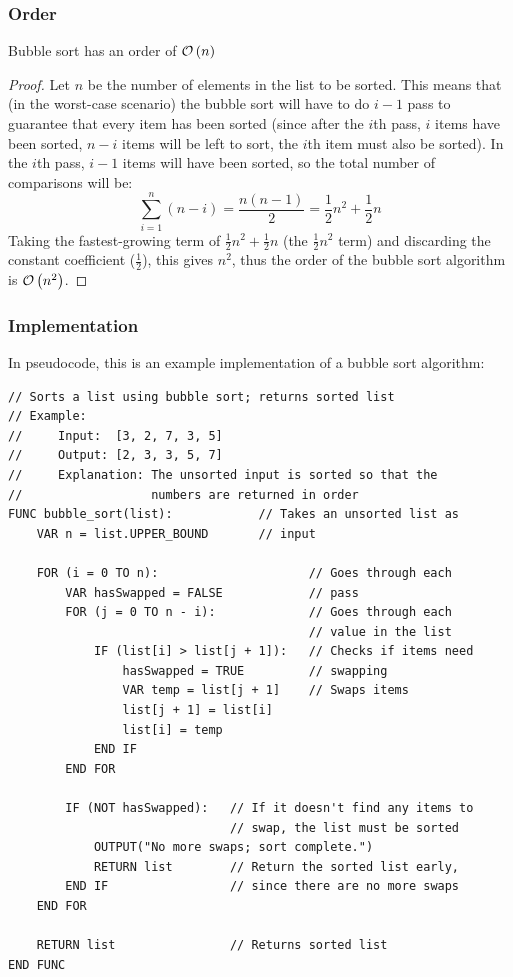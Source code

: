         \subsubsection{Order}
            \begin{theorem}
                Bubble sort has an order of $\mathcal{O}\left(n\right)$
            \end{theorem}
            \begin{proof}
                Let $n$ be the number of elements in the list to be sorted.
                This means that (in the worst-case scenario) the bubble sort will have to do $i-1$ pass to guarantee that every item has been sorted (since after the $i$th pass, $i$ items have been sorted, $n-i$ items will be left to sort, the $i$th item must also be sorted).
                In the $i$th pass, $i-1$ items will have been sorted, so the total number of comparisons will be:
                $$\sum_{i=1}^n(n-i)=\frac{n(n-1)}{2}=\frac{1}{2}n^2+\frac{1}{2}n$$
                Taking the fastest-growing term of $\frac{1}{2}n^2+\frac{1}{2}n$ (the $\frac{1}{2}n^2$ term) and discarding the constant coefficient ($\frac{1}{2}$), this gives $n^2$, thus the order of the bubble sort algorithm is $\mathcal{O}\left(n^2\right)$.
            \end{proof}
        
        \subsubsection{Implementation}
            In pseudocode, this is an example implementation of a bubble sort algorithm:
            
            \begin{verbatim}
// Sorts a list using bubble sort; returns sorted list
// Example:
//     Input:  [3, 2, 7, 3, 5]
//     Output: [2, 3, 3, 5, 7]
//     Explanation: The unsorted input is sorted so that the 
//                  numbers are returned in order
FUNC bubble_sort(list):            // Takes an unsorted list as
    VAR n = list.UPPER_BOUND       // input

    FOR (i = 0 TO n):                     // Goes through each
        VAR hasSwapped = FALSE            // pass
        FOR (j = 0 TO n - i):             // Goes through each
                                          // value in the list
            IF (list[i] > list[j + 1]):   // Checks if items need
                hasSwapped = TRUE         // swapping
                VAR temp = list[j + 1]    // Swaps items
                list[j + 1] = list[i]
                list[i] = temp
            END IF
        END FOR

        IF (NOT hasSwapped):   // If it doesn't find any items to
                               // swap, the list must be sorted
            OUTPUT("No more swaps; sort complete.")
            RETURN list        // Return the sorted list early,
        END IF                 // since there are no more swaps
    END FOR

    RETURN list                // Returns sorted list
END FUNC
            \end{verbatim}
    \newpage

